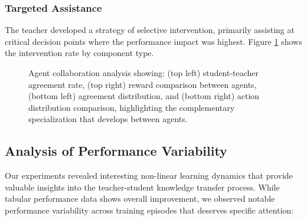 \documentclass[twoside,11pt]{article}
\begin{document}
\subsubsection{Targeted Assistance}
The teacher developed a strategy of selective intervention, primarily assisting at critical decision points where the performance impact was highest. Figure \ref{fig:agent_collaboration} shows the intervention rate by component type.

\begin{figure}[ht]
\centering
{}
\caption{Agent collaboration analysis showing: (top left) student-teacher agreement rate, (top right) reward comparison between agents, (bottom left) agreement distribution, and (bottom right) action distribution comparison, highlighting the complementary specialization that develops between agents.}
\label{fig:agent_collaboration}
\end{figure}

\subsection{Analysis of Performance Variability}

Our experiments revealed interesting non-linear learning dynamics that provide valuable insights into the teacher-student knowledge transfer process. While tabular performance data shows overall improvement, we observed notable performance variability across training episodes that deserves specific attention:
\end{document}
